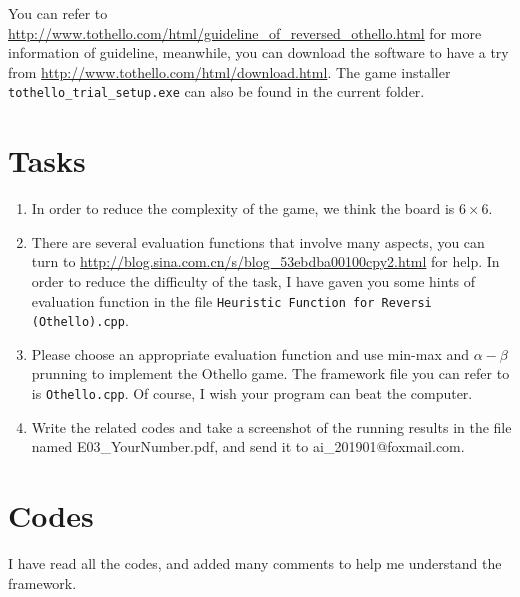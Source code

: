 \documentclass[a4paper, 11pt]{article}
\begin{document}
You can refer to \url{http://www.tothello.com/html/guideline_of_reversed_othello.html} for more information of guideline, meanwhile, you can download the software to have a try from \url{http://www.tothello.com/html/download.html}. The game installer \texttt{tothello\_trial\_setup.exe} can also be found in the current folder.



\section{Tasks}
\begin{enumerate}

\item In order to reduce the complexity of the game, we think the board is $6\times 6$.

\item There are several evaluation functions that involve many aspects, you can turn to \url{http://blog.sina.com.cn/s/blog_53ebdba00100cpy2.html} for help. In order to reduce the difficulty of the task, I have gaven you some hints of evaluation function in the file \texttt{Heuristic Function for Reversi (Othello).cpp}.

\item Please choose an appropriate evaluation function and use min-max and $\alpha-\beta$ prunning to implement the Othello game. The framework file you can refer to is \texttt{Othello.cpp}. Of course, I wish your program can beat the computer.

\item Write the related codes and take a screenshot of the running results in the file named \textsf{E03\_YourNumber.pdf}, and send it to \textsf{ai\_201901@foxmail.com}.
\end{enumerate}

\section{Codes}

I have read all the codes, and added many comments to help me understand the framework.
\end{document}
